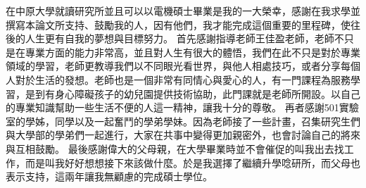 \begin{acknowledgementszh}
在中原大學就讀研究所並且可以以電機碩士畢業是我的一大榮幸，感謝在我求學並撰寫本論文所支持、鼓勵我的人，因有他們，我才能完成這個重要的里程碑，使往後的人生更有自我的夢想與目標努力。
首先感謝指導老師王佳盈老師，老師不只是在專業方面的能力非常高，並且對人生有很大的體悟，我們在此不只是對於專業領域的學習，老師更教導我們以不同眼光看世界，與他人相處技巧，或者分享每個人對於生活的發想。老師也是一個非常有同情心與愛心的人，有一門課程為服務學習，是到有身心障礙孩子的幼兒園提供技術協助，此門課就是老師所開設。以自己的專業知識幫助一些生活不便的人這一精神，讓我十分的尊敬。
再者感謝501實驗室的學姊，同學以及一起奮鬥的學弟學妹。因為老師接了一些計畫，召集研究生們與大學部的學弟們一起進行，大家在共事中變得更加親密外，也會討論自己的將來與互相鼓勵。
最後感謝偉大的父母親，在大學畢業時並不會催促的叫我出去找工作，而是叫我好好想想接下來該做什麼。於是我選擇了繼續升學唸研所，而父母也表示支持，這兩年讓我無顧慮的完成碩士學位。
\end{acknowledgementszh}